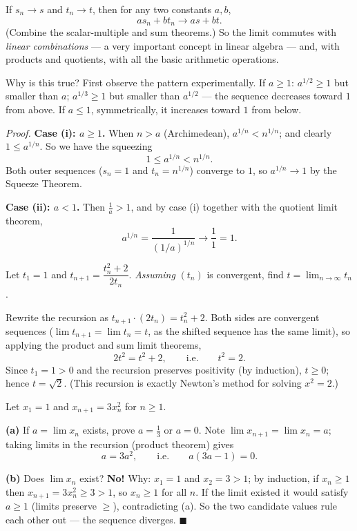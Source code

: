 \documentclass[11pt]{report}
\begin{document}
\begin{corbox}
If $s_n \to s$ and $t_n \to t$, then for any two constants $a, b$,
\[
a s_n + b t_n \longrightarrow a s + b t.
\]
(Combine the scalar-multiple and sum theorems.) So the limit commutes with \emph{linear combinations} --- a very important concept in linear algebra --- and, with products and quotients, with all the basic arithmetic operations.
\end{corbox}

\begin{exbox}
Why is this true? First observe the pattern experimentally. If $a \geq 1$: $a^{1/2} \geq 1$ but smaller than $a$; $a^{1/3} \geq 1$ but smaller than $a^{1/2}$ --- the sequence decreases toward $1$ from above. If $a \leq 1$, symmetrically, it increases toward $1$ from below.

\emph{Proof.} \textbf{Case (i): $a \geq 1$.} When $n > a$ (Archimedean), $a^{1/n} < n^{1/n}$; and clearly $1 \leq a^{1/n}$. So we have the squeezing
\[
1 \leq a^{1/n} < n^{1/n}.
\]
Both outer sequences ($s_n = 1$ and $t_n = n^{1/n}$) converge to $1$, so $a^{1/n} \to 1$ by the Squeeze Theorem.

\textbf{Case (ii): $a < 1$.} Then $\tfrac1a > 1$, and by case (i) together with the quotient limit theorem,
\[
a^{1/n} = \frac{1}{(1/a)^{1/n}} \longrightarrow \frac11 = 1. \tag*{$\blacksquare$}
\]
\end{exbox}

\begin{exbox}
Let $t_1 = 1$ and $t_{n+1} = \dfrac{t_n^2 + 2}{2 t_n}$. \emph{Assuming} $(t_n)$ is convergent, find $t = \lim_{n\to\infty} t_n$.

Rewrite the recursion as $t_{n+1} \cdot (2 t_n) = t_n^2 + 2$. Both sides are convergent sequences ($\lim t_{n+1} = \lim t_n = t$, as the shifted sequence has the same limit), so applying the product and sum limit theorems,
\[
2 t^2 = t^2 + 2, \qquad \text{i.e.} \qquad t^2 = 2.
\]
Since $t_1 = 1 > 0$ and the recursion preserves positivity (by induction), $t \geq 0$; hence $t = \sqrt2$. (This recursion is exactly Newton's method for solving $x^2 = 2$.)
\end{exbox}

\begin{exbox}
Let $x_1 = 1$ and $x_{n+1} = 3 x_n^2$ for $n \geq 1$.

\textbf{(a)} If $a = \lim x_n$ exists, prove $a = \tfrac13$ or $a = 0$. Note $\lim x_{n+1} = \lim x_n = a$; taking limits in the recursion (product theorem) gives
\[
a = 3a^2, \qquad \text{i.e.} \qquad a(3a - 1) = 0.
\]

\textbf{(b)} Does $\lim x_n$ exist? \textbf{No!} Why: $x_1 = 1$ and $x_2 = 3 > 1$; by induction, if $x_n \geq 1$ then $x_{n+1} = 3x_n^2 \geq 3 > 1$, so $x_n \geq 1$ for all $n$. If the limit existed it would satisfy $a \geq 1$ (limits preserve $\geq$), contradicting (a). So the two candidate values rule each other out --- the sequence diverges. \hfill $\blacksquare$
\end{exbox}
\end{document}
